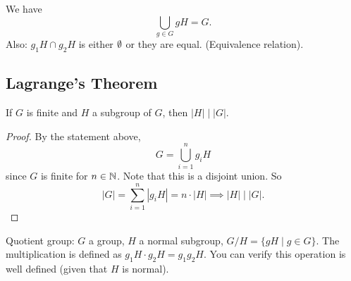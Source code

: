 \begin{note} We have
   \[
\bigcup_{g\in G} gH = G.
   \]
Also: $g_1H \cap g_2H $ is either $\emptyset$ or they are equal. (Equivalence relation).
\end{note}

\subsection{Lagrange's Theorem}
\begin{prop}
If $G$ is finite and $H$ a subgroup of $G$, then $|H| \mid |G|$.
\end{prop}


\begin{proof}
    By the statement above,
    \[
    G = \bigcup_{i=1}^{n}g_iH
    \]
    since $G$ is finite for $n \in \mathbb{N}$. Note that this is a disjoint union. So \[
        |G|= \sum_{i=1}^{n} |g_iH| = n \cdot |H| \implies |H| \mid |G|.
    \]
\end{proof}
Quotient group: $G$ a group, $H$ a normal subgroup, $G/H = \{ gH \mid g \in G \}$. The multiplication is defined as $g_1H \cdot g_2H = g_1g_2H$. You can verify this operation is well defined (given that $H$ is normal).


